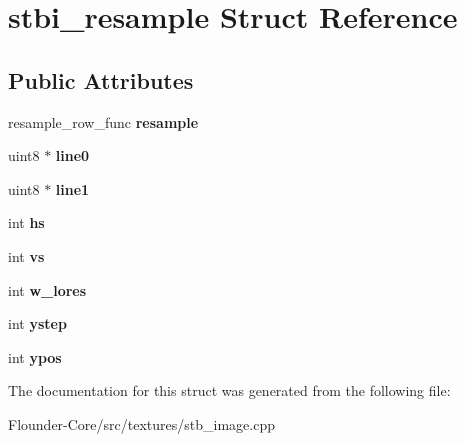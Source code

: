 \hypertarget{structstbi__resample}{}\section{stbi\+\_\+resample Struct Reference}
\label{structstbi__resample}
\subsection*{Public Attributes}
\begin{DoxyCompactItemize}
\item 
\mbox{\label{structstbi__resample_a94091463ebc5933cdaf7a813025b6e19}} 
resample\+\_\+row\+\_\+func {\bfseries resample}
\item 
\mbox{\label{structstbi__resample_a30c51395efffb663b183d7c64def6db3}} 
uint8 $\ast$ {\bfseries line0}
\item 
\mbox{\label{structstbi__resample_ac1165a6da3cf652b951056667f89b1f2}} 
uint8 $\ast$ {\bfseries line1}
\item 
\mbox{\label{structstbi__resample_a1513390ba0102364169a52ff26d5e0f2}} 
int {\bfseries hs}
\item 
\mbox{\label{structstbi__resample_a331c717f53239339c0c678f92a7bf4d5}} 
int {\bfseries vs}
\item 
\mbox{\label{structstbi__resample_a41d43c7b0d6caafbf0dfa8ef064bd2a2}} 
int {\bfseries w\+\_\+lores}
\item 
\mbox{\label{structstbi__resample_a0c479143447d103e73348c89f8b4ef1c}} 
int {\bfseries ystep}
\item 
\mbox{\label{structstbi__resample_aa1f1ad33e739f7a38fbad8752f64f983}} 
int {\bfseries ypos}
\end{DoxyCompactItemize}


The documentation for this struct was generated from the following file\+:\begin{DoxyCompactItemize}
\item 
Flounder-\/\+Core/src/textures/stb\+\_\+image.\+cpp\end{DoxyCompactItemize}

